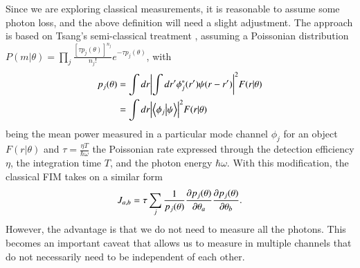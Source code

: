 \documentclass[reprint,amsmath,amssymb,aps,pra,floatfix]{revtex4-2}
\begin{document}
Since we are exploring classical measurements, it is reasonable to assume some photon loss, and the above definition will need a slight adjustment. The approach is based on Tsang's semi-classical treatment \cite{tsang2018subdiffraction}, assuming a Poissonian distribution
$    P(m|\theta) = \prod_j \frac{[\tau p_j(\theta)]^{n_j}}{n_j!} e^{-\tau p_j(\theta)}$,
with
\begin{align}
    p_j(\theta) &= \int dr \abs{\int dr' \phi_j^*(r') \psi(r-r')}^2 F(r|\theta) \nonumber \\
    &= \int dr \abs{ \braket{\phi_j}{\psi} }^2 F(r|\theta)
\label{eq:ms_prob}
\end{align}
being the mean power measured in a particular mode channel $\phi_j$ for an object $F(r|\theta)$ and    $\tau = \frac{\eta T}{\hbar \omega}$
the Poissonian rate expressed through  the detection efficiency $\eta$, the integration time $T$, and the  photon energy $\hbar \omega$. With this  modification, the classical FIM takes on a similar form
\begin{align}
    J_{a,b} = \tau \sum_j\frac{1}{p_j(\theta)} \pdv{p_j(\theta)}{\theta_a}  \pdv{p_j(\theta)}{\theta_b}.
\label{eq:FI_MS}
\end{align}
However, the advantage is that we do not need to measure all the photons. This becomes an important caveat that allows us to measure in multiple channels that do not necessarily need to be independent of each other.
\end{document}
